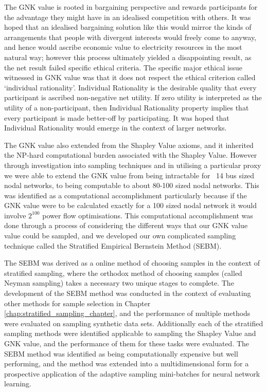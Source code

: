 The GNK value is rooted in bargaining perspective and rewards participants for the advantage they might have in an idealised competition with others.
It was hoped that an idealised bargaining solution like this would mirror the kinds of arrangements that people with divergent interests would freely come to anyway, and hence would ascribe economic value to electricity resources in the most natural way; however this process ultimately yielded a disappointing result, as the net result failed specific ethical criteria.
The specific major ethical issue witnessed in GNK value was that it does not respect the ethical criterion called `individual rationality'.
Individual Rationality is the desirable quality that every participant is ascribed non-negative net utility.
If zero utility is interpreted as the utility of a non-participant, then Individual Rationality property implies that every participant is made better-off by participating.
It was hoped that Individual Rationality would emerge in the context of larger networks.

The GNK value also extended from the Shapley Value axioms, and it inherited the NP-hard computational burden associated with the Shapley Value.
However through investigation into sampling techniques and in utilising a particular proxy we were able to extend the GNK value from being intractable for ~14 bus sized nodal networks, to being computable to about 80-100 sized nodal networks.
This was identified as a computational accomplishment particularly because if the GNK value were to be calculated exactly for a 100 sized nodal network it would involve $2^{100}$ power flow optimisations.
This computational accomplishment was done through a process of considering the different ways that our GNK value value could be sampled, and we developed our own complicated sampling technique called the Stratified Empirical Bernstein Method (SEBM).

The SEBM was derived as a online method of choosing samples in the context of stratified sampling, where the orthodox method of choosing samples (called Neyman sampling) takes a necessary two unique stages to complete.
The development of the SEBM method was conducted in the context of evaluating other methods for sample selection in Chapter \ref{chap:stratified_sampling_chapter}, and the performance of multiple methods were evaluated on sampling synthetic data sets.
Additionally each of the stratified sampling methods were identified applicable to sampling the Shapley Value and GNK value, and the performance of them for these tasks were evaluated.
The SEBM method was identified as being computationally expensive but well performing, and the method was extended into a multidimensional form for a prospective application of the adaptive sampling mini-batches for neural network learning.

